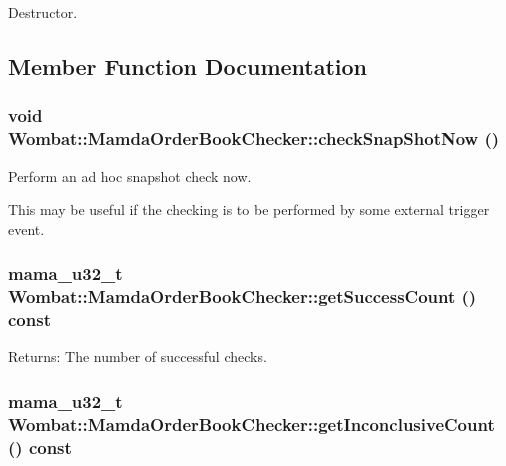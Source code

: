 Destructor. 



\subsection{Member Function Documentation}
\hypertarget{classWombat_1_1MamdaOrderBookChecker_c16e5f139b6d15c90f5b22f74d63f1e6}{
\subsubsection[checkSnapShotNow]{\setlength{\rightskip}{0pt plus 5cm}void Wombat::Mamda\-Order\-Book\-Checker::check\-Snap\-Shot\-Now ()}}
\label{classWombat_1_1MamdaOrderBookChecker_c16e5f139b6d15c90f5b22f74d63f1e6}


Perform an ad hoc snapshot check now. 

This may be useful if the checking is to be performed by some external trigger event. \hypertarget{classWombat_1_1MamdaOrderBookChecker_bec33786f8ed6f0db835f4e4569bdfe6}{
\subsubsection[getSuccessCount]{\setlength{\rightskip}{0pt plus 5cm}mama\_\-u32\_\-t Wombat::Mamda\-Order\-Book\-Checker::get\-Success\-Count () const}}
\label{classWombat_1_1MamdaOrderBookChecker_bec33786f8ed6f0db835f4e4569bdfe6}


\begin{Desc}
\item[Returns:]The number of successful checks. \end{Desc}
\hypertarget{classWombat_1_1MamdaOrderBookChecker_5d7747faefdbf0dd53adc6b1dfae7567}{
\subsubsection[getInconclusiveCount]{\setlength{\rightskip}{0pt plus 5cm}mama\_\-u32\_\-t Wombat::Mamda\-Order\-Book\-Checker::get\-Inconclusive\-Count () const}}
\label{classWombat_1_1MamdaOrderBookChecker_5d7747faefdbf0dd53adc6b1dfae7567}


